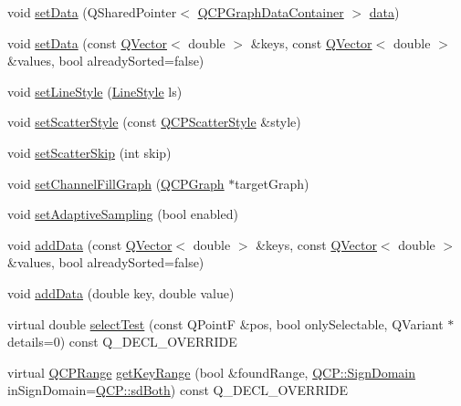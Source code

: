 \begin{DoxyCompactItemize}
\item 
void \hyperlink{class_q_c_p_graph_a1eae9429a316b008e2d99b2d65a54395}{set\+Data} (Q\+Shared\+Pointer$<$ \hyperlink{class_q_c_p_data_container}{Q\+C\+P\+Graph\+Data\+Container} $>$ \hyperlink{class_q_c_p_graph_a04514a2b1fb61a280ead66abe80b89ab}{data})
\item 
void \hyperlink{class_q_c_p_graph_a73578d786532132310a926c3cd529b29}{set\+Data} (const \hyperlink{class_q_vector}{Q\+Vector}$<$ double $>$ \&keys, const \hyperlink{class_q_vector}{Q\+Vector}$<$ double $>$ \&values, bool already\+Sorted=false)
\item 
void \hyperlink{class_q_c_p_graph_a513fecccff5b2a50ce53f665338c60ff}{set\+Line\+Style} (\hyperlink{class_q_c_p_graph_ad60175cd9b5cac937c5ee685c32c0859}{Line\+Style} ls)
\item 
void \hyperlink{class_q_c_p_graph_a12bd17a8ba21983163ec5d8f42a9fea5}{set\+Scatter\+Style} (const \hyperlink{class_q_c_p_scatter_style}{Q\+C\+P\+Scatter\+Style} \&style)
\item 
void \hyperlink{class_q_c_p_graph_a17cebd3196f434258abb82ba6dc443f2}{set\+Scatter\+Skip} (int skip)
\item 
void \hyperlink{class_q_c_p_graph_a2d03156df1b64037a2e36cfa50351ca3}{set\+Channel\+Fill\+Graph} (\hyperlink{class_q_c_p_graph}{Q\+C\+P\+Graph} $\ast$target\+Graph)
\item 
void \hyperlink{class_q_c_p_graph_ab468cd600160f327836aa0644291e64c}{set\+Adaptive\+Sampling} (bool enabled)
\item 
void \hyperlink{class_q_c_p_graph_ae0555c0d3fe0fa7cb8628f88158d420f}{add\+Data} (const \hyperlink{class_q_vector}{Q\+Vector}$<$ double $>$ \&keys, const \hyperlink{class_q_vector}{Q\+Vector}$<$ double $>$ \&values, bool already\+Sorted=false)
\item 
void \hyperlink{class_q_c_p_graph_a0bf98b1972286cfb7b1c4b7dd6ae2012}{add\+Data} (double key, double value)
\item 
virtual double \hyperlink{class_q_c_p_graph_a6d669d04462d272c6aa0e5f85846d673}{select\+Test} (const Q\+PointF \&pos, bool only\+Selectable, Q\+Variant $\ast$details=0) const Q\+\_\+\+D\+E\+C\+L\+\_\+\+O\+V\+E\+R\+R\+I\+DE
\item 
virtual \hyperlink{class_q_c_p_range}{Q\+C\+P\+Range} \hyperlink{class_q_c_p_graph_aac47c6189e3aea46ea46939e5d14796c}{get\+Key\+Range} (bool \&found\+Range, \hyperlink{namespace_q_c_p_afd50e7cf431af385614987d8553ff8a9}{Q\+C\+P\+::\+Sign\+Domain} in\+Sign\+Domain=\hyperlink{namespace_q_c_p_afd50e7cf431af385614987d8553ff8a9a3dee7e9cd2fedce9253b83e172626a6c}{Q\+C\+P\+::sd\+Both}) const Q\+\_\+\+D\+E\+C\+L\+\_\+\+O\+V\+E\+R\+R\+I\+DE

\end{DoxyCompactItemize}
